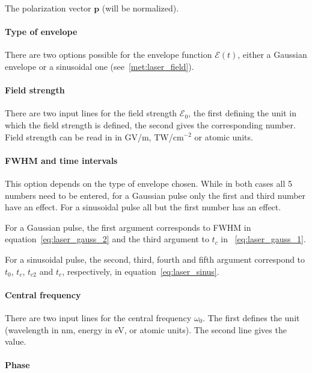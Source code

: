 \documentclass[a4paper,11pt,DIV=15,openany,twoside=false]{scrbook}
\newcommand{\VEC}[1]{\ensuremath{\mathbf{#1}}}
\begin{document}
The polarization vector $\VEC{p}$ (will be normalized).

\paragraph{Type of envelope}

There are two options possible for the envelope function $\mathcal{E}(t)$, either a Gaussian envelope or a sinusoidal one (see~\ref{met:laser_field}).

\paragraph{Field strength}

There are two input lines for the field strength $\mathcal{E}_0$, the first defining the unit in which the field strength is defined, the second gives the corresponding number. Field strength can be read in in GV/m, TW/cm$^{-2}$ or atomic units.

\paragraph{FWHM and time intervals}

This option depends on the type of envelope chosen. While in both cases all 5 numbers need to be entered, for a Gaussian pulse only the first and third number have an effect. For a sinusoidal pulse all but the first number has an effect.

For a Gaussian pulse, the first argument corresponds to FWHM in equation~\eqref{eq:laser_gauss_2} and the third argument to $t_c$ in ~\eqref{eq:laser_gauss_1}.

For a sinusoidal pulse, the second, third, fourth and fifth argument correspond to $t_0$, $t_c$, $t_{c2}$ and $t_e$, respectively, in equation~\eqref{eq:laser_sinus}.

\paragraph{Central frequency}

There are two input lines for the central frequency $\omega_0$. The first defines the unit (wavelength in nm, energy in eV, or atomic units). The second line gives the value.

\paragraph{Phase}
\end{document}
